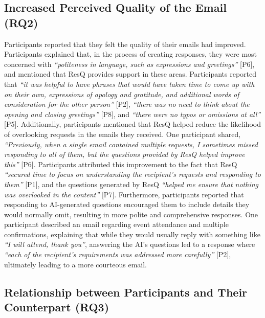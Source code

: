 \subsection{Increased Perceived Quality of the Email (RQ2)}
\label{sec:result2_quality}
Participants reported that they felt the quality of their emails had improved. 
Participants explained that, in the process of creating responses, they were most concerned with \textit{``politeness in language, such as expressions and greetings''} [P6], and mentioned that ResQ provides support in these areas.
Participants reported that \textit{``it was helpful to have phrases that would have taken time to come up with on their own, expressions of apology and gratitude, and additional words of consideration for the other person''} [P2], \textit{``there was no need to think about the opening and closing greetings''} [P8], and \textit{``there were no typos or omissions at all''} [P5].
Additionally, participants mentioned that ResQ helped reduce the likelihood of overlooking requests in the emails they received. 
One participant shared, \textit{``Previously, when a single email contained multiple requests, I sometimes missed responding to all of them, but the questions provided by ResQ helped improve this''} [P6].
Participants attributed this improvement to the fact that ResQ \textit{``secured time to focus on understanding the recipient's requests and responding to them''} [P1], and the questions generated by ResQ \textit{``helped me ensure that nothing was overlooked in the content''} [P7]. 
Furthermore, participants reported that responding to AI-generated questions encouraged them to include details they would normally omit, resulting in more polite and comprehensive responses. 
One participant described an email regarding event attendance and multiple confirmations, explaining that while they would usually reply with something like \textit{``I will attend, thank you''}, answering the AI's questions led to a response where \textit{``each of the recipient's requirements was addressed more carefully''} [P2], ultimately leading to a more courteous email.

\subsection{Relationship between Participants and Their Counterpart (RQ3)}
